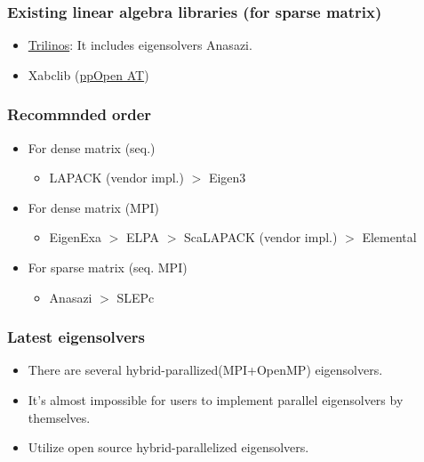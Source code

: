 \begin{frame}
  \frametitle{Existing linear algebra libraries (for sparse matrix)}
  \begin{itemize}
  \item \href{http://trilinos.org}{Trilinos}: It includes eigensolvers Anasazi.
  \item Xabclib (\href{http://ppopenhpc.cc.u-tokyo.ac.jp/}{ppOpen AT})
  \end{itemize}
\end{frame}

\begin{frame}
  \frametitle{Recommnded order}
  \begin{itemize}
  \item For dense matrix (seq.)
    \begin{itemize}
      \item LAPACK (vendor impl.) $>$ Eigen3
    \end{itemize}
  \item For dense matrix (MPI)
    \begin{itemize}
      \item EigenExa $>$ ELPA $>$ ScaLAPACK (vendor impl.) $>$ Elemental
    \end{itemize}
  \item For sparse matrix (seq. MPI)
    \begin{itemize}
      \item Anasazi $>$ SLEPc
    \end{itemize}
  \end{itemize}
\end{frame}

\begin{frame}
  \frametitle{Latest eigensolvers}
  \begin{itemize}
    \setlength{\itemsep}{1em}
  \item There are several hybrid-parallized(MPI+OpenMP) eigensolvers.
  \item It's almost impossible for users to implement parallel eigensolvers by themselves.
  \item Utilize open source hybrid-parallelized eigensolvers.
  \end{itemize}
\end{frame}

